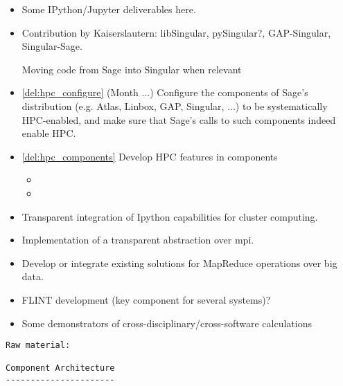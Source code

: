 \begin{Workpackage}{\thewpno}
\begin{WPDeliverables}
\begin{itemize}
    \item Some IPython/Jupyter deliverables here.

    \item Contribution by Kaiserslautern: libSingular, pySingular?,
      GAP-Singular, Singular-Sage.

      Moving code from Sage into Singular when relevant


    \item \ref{del:hpc_configure} (Month ...) Configure the components of
      Sage's distribution (e.g. Atlas, Linbox, GAP, Singular, ...) to be
      systematically HPC-enabled, and make sure that Sage's calls to such
      components indeed enable HPC.

    \item \ref{del:hpc_components}
      Develop HPC features in components
      \begin{itemize}
      \item {}
      \item {}
      \end{itemize}


    \item Transparent integration of Ipython capabilities for cluster computing.
    \item Implementation of a transparent abstraction over mpi.
    \item Develop or integrate existing solutions for MapReduce operations
      over big data.

    \item FLINT development (key component for several systems)?

    \item Some demonstrators of cross-disciplinary/cross-software calculations

    \end{itemize}
  \end{WPDeliverables}
\begin{verbatim}
Raw material:

Component Architecture
----------------------


\end{verbatim}
\end{Workpackage}
